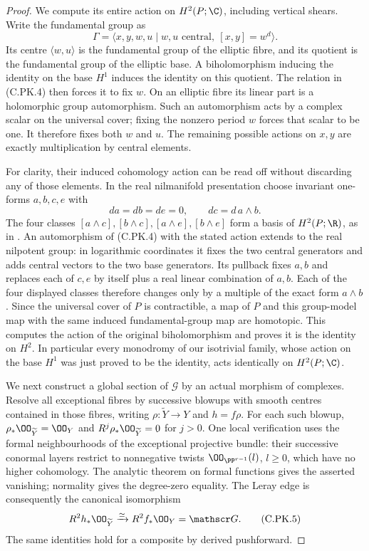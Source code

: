 \begin{proof}
We compute its entire action on $H^2(P;\C)$, including
vertical shears. Write the fundamental group as
\[
 \Gamma=\langle x,y,w,u\mid
       w,u\text{ central},\ [x,y]=w^d\rangle.
\tag{C.PK.4}
\]
Its centre $\langle w,u\rangle$ is the fundamental group
of the elliptic fibre, and its quotient is the fundamental
group of the elliptic base. A biholomorphism inducing the
identity on the base $H^1$ induces the identity on this
quotient. The relation in (C.PK.4) then forces it to fix
$w$. On an elliptic fibre its linear part is a holomorphic
group automorphism. Such an automorphism acts by a complex
scalar on the universal cover; fixing the nonzero period
$w$ forces that scalar to be one. It therefore fixes both
$w$ and $u$. The remaining possible actions on $x,y$ are
exactly multiplication by central elements.

For clarity, their induced cohomology action can be read
off without discarding any of those elements. In the real
nilmanifold presentation choose invariant one-forms
$a,b,c,e$ with
\[
 da=db=de=0,\qquad dc=d\,a\wedge b.
\]
The four classes $[a\wedge c],[b\wedge c],
[a\wedge e],[b\wedge e]$ form a basis of
$H^2(P;\R)$, as in \cite[\S3]{Borcea1984}.
An automorphism of (C.PK.4) with the stated action extends
to the real nilpotent group: in logarithmic coordinates it
fixes the two central generators and adds central vectors
to the two base generators. Its pullback fixes $a,b$ and
replaces each of $c,e$ by itself plus a real linear
combination of $a,b$. Each of the four displayed classes
therefore changes only by a multiple of the exact form
$a\wedge b$. Since the universal cover of $P$ is
contractible, a map of $P$ and this group-model map with
the same induced fundamental-group map are homotopic.
This computes the action of the original biholomorphism
and proves it is the identity on $H^2$.
In particular every monodromy of our isotrivial family,
whose action on the base $H^1$ was just proved to be the
identity, acts identically on $H^2(P;\C)$.

We next construct a global section of $\mathscr G$ by an
actual morphism of complexes. Resolve all exceptional
fibres by successive blowups with smooth centres contained
in those fibres, writing
$\rho:\widetilde Y\to Y$ and $h=f\rho$. For each such
blowup, $\rho_*\OO_{\widetilde Y}=\OO_Y$ and
$R^j\rho_*\OO_{\widetilde Y}=0$ for $j>0$.
One local verification uses the formal neighbourhoods of
the exceptional projective bundle: their successive
conormal layers restrict to nonnegative twists
$\OO_{\PP^{r-1}}(l)$, $l\ge0$, which have no higher
cohomology. The analytic theorem on formal functions
gives the asserted vanishing; normality gives the
degree-zero equality. The Leray edge is consequently the
canonical isomorphism
\[
 R^2h_*\OO_{\widetilde Y}\xrightarrow{\simeq}
 R^2f_*\OO_Y=\mathscr G.
\tag{C.PK.5}
\]
The same identities hold for a composite by derived
pushforward.


\end{proof}
